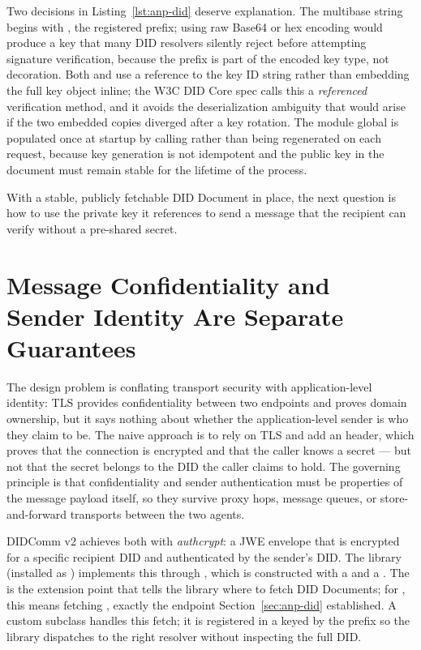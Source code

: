 Two decisions in Listing~\ref{lst:anp-did} deserve explanation.
The multibase string begins with , the registered
 prefix; using raw Base64 or hex encoding would produce
a key that many DID resolvers silently reject before attempting signature
verification, because the prefix is part of the encoded key type, not
decoration. Both  and  use
a reference to the key ID string rather than embedding the full key object
inline; the W3C DID Core spec calls this a \emph{referenced} verification
method, and it avoids the deserialization ambiguity that would arise if the
two embedded copies diverged after a key rotation. The 
module global is populated once at startup by calling
 rather than being regenerated on
each request, because key generation is not idempotent and the public key
in the document must remain stable for the lifetime of the process.

With a stable, publicly fetchable DID Document in place, the next question
is how to use the private key it references to send a message that the
recipient can verify without a pre-shared secret.


\section{Message Confidentiality and Sender Identity Are Separate Guarantees}
\label{sec:anp-didcomm}

The design problem is conflating transport security with application-level
identity: TLS provides confidentiality between two endpoints and proves
domain ownership, but it says nothing about whether the application-level
sender is who they claim to be. The naive approach is to rely on TLS and
add an  header, which proves that the connection is
encrypted and that the caller knows a secret --- but not that the secret
belongs to the DID the caller claims to hold. The governing principle is
that confidentiality and sender authentication must be properties of the
message payload itself, so they survive proxy hops, message queues, or
store-and-forward transports between the two agents.

DIDComm v2 achieves both with \emph{authcrypt}: a JWE envelope that is
encrypted for a specific recipient DID and authenticated by the sender's
DID\@. The  library (installed as
) implements this through
, which is constructed with a 
and a . The  is the extension
point that tells the library where to fetch DID Documents; for
, this means fetching
, exactly the endpoint
Section~\ref{sec:anp-did} established. A custom 
subclass handles this fetch; it is registered in a 
keyed by the  prefix so the library dispatches to the
right resolver without inspecting the full DID.

